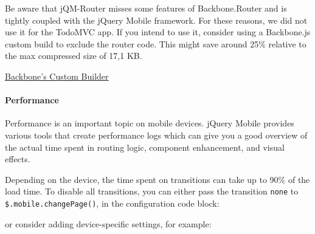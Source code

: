 \documentclass[9pt]{book}
\newenvironment{Shaded}{}{}
\newcommand{\KeywordTok}[1]{\textcolor[rgb]{0.00,0.44,0.13}{\textbf{{#1}}}}
\newcommand{\StringTok}[1]{\textcolor[rgb]{0.25,0.44,0.63}{{#1}}}
\newcommand{\CommentTok}[1]{\textcolor[rgb]{0.38,0.63,0.69}{\textit{{#1}}}}
\newcommand{\OtherTok}[1]{\textcolor[rgb]{0.00,0.44,0.13}{{#1}}}
\newcommand{\FunctionTok}[1]{\textcolor[rgb]{0.02,0.16,0.49}{{#1}}}
\newcommand{\NormalTok}[1]{{#1}}
\begin{document}
Be aware that jQM-Router misses some features of Backbone.Router and is
tightly coupled with the jQuery Mobile framework. For these reasons, we
did not use it for the TodoMVC app. If you intend to use it, consider
using a Backbone.js custom build to exclude the router code. This might
save around 25\% relative to the max compressed size of 17,1 KB.

\href{http://gregfranko.com/backbone/customBuild/}{Backbone's Custom
Builder}

\paragraph{Performance}\label{performance}

Performance is an important topic on mobile devices. jQuery Mobile
provides various tools that create performance logs which can give you a
good overview of the actual time spent in routing logic, component
enhancement, and visual effects.

Depending on the device, the time spent on transitions can take up to
90\% of the load time. To disable all transitions, you can either pass
the transition \texttt{none} to \texttt{\$.mobile.changePage()}, in the
configuration code block:

\begin{Shaded}
\end{Shaded}

or consider adding device-specific settings, for example:
\end{document}
